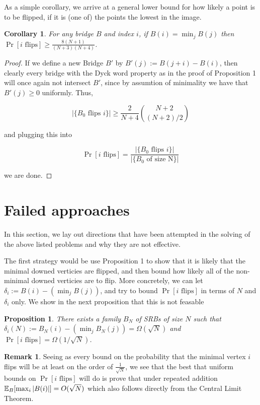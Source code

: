 \documentclass{article}
\newtheorem{corollary}{Corollary}
\newtheorem{proposition}{Proposition}
\theoremstyle{definition}
\newtheorem{remark}{Remark}
\begin{document}
As a simple corollary, we arrive at a general lower bound for how likely a point is to be flipped, if it is (one of) the points the lowest in the image.

\begin{corollary} For any bridge $B$ and index $i$, if $B(i)=\min_jB(j)$ then $\Pr[i \mathrm{\,\, flips}]\geq \frac{8(N+1)}{(N+3)(N+4)}$.
\end{corollary}
\begin{proof} If we define a new Bridge $B'$ by $B'(j):=B(j+i)-B(i)$, then clearly every bridge with the Dyck word property as in the proof of Proposition 1 will once again not intersect $B'$, since by assumtion of minimality we have that $B'(j)\geq0$ uniformly. Thus,

$$|\{B_0 \,\, \mathrm{flips\,\, }i\}|\geq \frac{2}{N+4}{N+2\choose (N+2)/2}$$

and plugging this into

$$\Pr[i\,\,\mathrm{flips}]=\frac{|\{B_0 \,\, \mathrm{flips\,\, }i\}|}{|\{B_0\,\,\mathrm{of\,\,size\,\,N}\}|}$$

we are done.
\end{proof}

\section{Failed approaches}

In this section, we lay out directions that have been attempted in the solving of the above listed problems and why they are not effective.

The first strategy would be use Proposition 1 to show that it is likely that the minimal downed verticies are flipped, and then bound how likely all of the non-minimal downed verticies are to flip. More concretely, we can let $\delta_i:=B(i)-(\min_jB(j))$, and try to bound $\Pr[i \,\,\mathrm{flips}]$ in terms of $N$ and $\delta_i$ only. We show in the next proposition that this is not feasable

\begin{proposition} There exists a family $B_N$ of SRBs of size $N$ such that $\delta_i(N):=B_N(i)-(\min_jB_N(j))=\Omega(\sqrt{N})$ and $\Pr[i \,\, \mathrm{flips}]=\Omega(1/\sqrt{N})$.
\end{proposition}

\begin{remark}
Seeing as every bound on the probability that the minimal vertex $i$ flips will be at least on the order of $\frac{1}{\sqrt{N}}$, we see that the best that uniform bounds on $\Pr[i \,\, \mathrm{flips}]$ will do is prove that under repeated addition $\mathbb{E}_{B}[\max_i|B(i)|]=O(\sqrt{N})$  which also follows directly from the Central Limit Theorem.
\end{remark}
\end{document}
